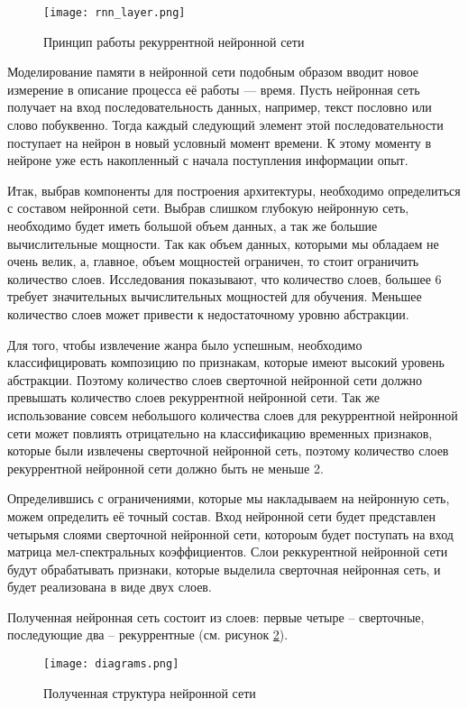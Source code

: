 \begin{figure}[h]
\centering
	\texttt{[image: rnn\_layer.png]}
	\caption{Принцип работы рекуррентной нейронной сети}
	\label{sec:design:network:rnn_layer}
\end{figure}

Моделирование памяти в нейронной сети подобным образом вводит новое измерение в описание процесса её работы — время. Пусть нейронная сеть получает на вход последовательность данных, например, текст пословно или слово побуквенно. Тогда каждый следующий элемент этой последовательности поступает на нейрон в новый условный момент времени. К этому моменту в нейроне уже есть накопленный с начала поступления информации опыт.

Итак, выбрав компоненты для построения архитектуры, необходимо определиться с составом нейронной сети. Выбрав слишком глубокую нейронную сеть, необходимо будет иметь большой объем данных, а так же большие вычислительные мощности. Так как объем данных, которыми мы обладаем не очень велик, а, главное, объем мощностей ограничен, то стоит ограничить количество слоев. Исследования показывают, что количество слоев, большее 6 требует значительных вычислительных мощностей для обучения. Меньшее количество слоев может привести к недостаточному уровню абстракции.

Для того, чтобы извлечение жанра было успешным, необходимо классифицировать композицию по признакам, которые имеют высокий уровень абстракции. Поэтому количество слоев сверточной нейронной сети должно превышать количество слоев рекуррентной нейронной сети. Так же использование совсем небольшого количества слоев для рекуррентной нейронной сети может повлиять отрицательно на классификацию временных признаков, которые были извлечены сверточной нейронной сеть, поэтому количество слоев рекуррентной нейронной сети должно быть не меньше 2.

Определившись с ограничениями, которые мы накладываем на нейронную сеть, можем определить её точный состав. Вход нейронной сети будет представлен четырьмя слоями сверточной нейронной сети, котороым будет поступать на вход матрица мел-спектральных коэффициентов. Слои реккурентной нейронной сети будут обрабатывать признаки, которые выделила сверточная нейронная сеть, и будет реализована в виде двух слоев.

Полученная нейронная сеть состоит из слоев: первые четыре -- сверточные, последующие два -- рекуррентные (см. рисунок \ref{sec:design:network:neuralnet}).

\begin{figure}[h]
\centering
	\texttt{[image: diagrams.png]}
	\caption{Полученная структура нейронной сети}
	\label{sec:design:network:neuralnet}
\end{figure}

